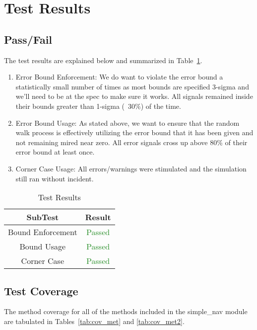 \section{Test Results}

\subsection{Pass/Fail}
The test results are explained below and summarized in Table~\ref{tab:results}.

\begin{enumerate}
\item{Error Bound Enforcement: We do want to violate the error bound a 
   statistically small number of times as most bounds are specified 3-sigma 
   and we'll need to be at the spec to make sure it works.  All signals remained 
   inside their bounds greater than 1-sigma (~30\%) of the time.  }
\item{Error Bound Usage: As stated above, we want to ensure that the random 
   walk process is effectively utilizing the error bound that it has been 
   given and not remaining mired near zero.  All error signals cross up above 
   80\% of their error bound at least once.}
\item{Corner Case Usage: All errors/warnings were stimulated and the simulation 
   still ran without incident. }
\end{enumerate}

\begin{table}[htbp]
    \caption{Test Results}
\label{tab:results}
    \centering \fontsize{10}{10}\selectfont
\begin{tabular}{|c||c|}
\hline
SubTest & Result \\ \hline \hline
Bound Enforcement& \textcolor{ForestGreen}{Passed} \\ \hline
Bound Usage &  \textcolor{ForestGreen}{Passed}\\ \hline
Corner Case &  \textcolor{ForestGreen}{Passed}\\ \hline
\end{tabular}
\end{table}



\subsection{Test Coverage}
The method coverage for all of the methods included in the simple\_nav 
module are tabulated in Tables~\ref{tab:cov_met} and \ref{tab:cov_met2}.


